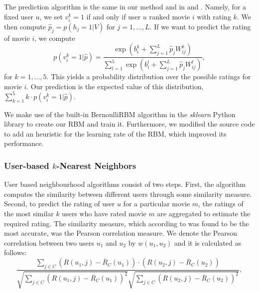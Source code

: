 \documentclass[10pt,conference,compsocconf]{IEEEtran}
\begin{document}
	The prediction algorithm is the same in our method and in \cite{SMH07} and \cite{L10}. Namely, for a fixed user $u$, we set $v^k_i=1$ if and only if user $u$ ranked movie $i$ with rating $k$. We then compute $\hat{p}_j=p(h_j=1|V)$ for $j=1,\dots, L$. If we want to predict the rating of movie $i$, we compute
	\begin{equation}
	p(v^k_i=1|\hat{p})=\frac{\exp(b^k_i+\sum_{j=1}^L \hat{p}_jW^k_{ij})}{\sum_{l=1}^{5}\exp(b^l_i+\sum_{j=1}^{L}\hat{p}_jW^l_{ij})},
	\end{equation}
	for $k=1,\dots, 5$. This yields a probability distribution over the possible ratings for movie $i$. Our prediction is the expected value of this distribution, $\sum_{k=1}^{5}k\cdot p(v^k_i=1|\hat{p})$.
	
	We make use of the built-in BernoulliRBM algorithm in the \emph{sklearn} Python library to create our RBM and train it. Furthermore, we modified the source code to add an heuristic for the learning rate of the RBM, which improved its performance.
	
	\subsubsection*{\textbf{User-based $k$-Nearest Neighbors}} User based neighbourhood algorithms consist of two steps. First, the algorithm computes the similarity between different users through some similarity measure. Second, to predict the rating of user $u$ for a particular movie $m$, the ratings of the most similar $k$ users who have rated movie $m$ are aggregated to estimate the required rating. The similarity measure, which according to \cite{L10} was found to be the most accurate, was the Pearson correlation measure. We denote the Pearson correlation between two users $u_1$ and $u_2$ by $w(u_1, u_2)$ and it is calculated as follows:
	\begin{equation} \label{eqn:pearson}
	\frac{\sum_{j \in C} (R(u_1, j) - \overline{R}_C(u_1))\cdot(R(u_2, j) - \overline{R}_C(u_2))}{\sqrt{\sum_{j \in C} (R(u_1, j) - \overline{R}_C(u_1))^2} \sqrt{\sum_{j \in C} (R(u_2, j) - \overline{R}_C(u_2))^2}},
	\end{equation}
	
\end{document}
